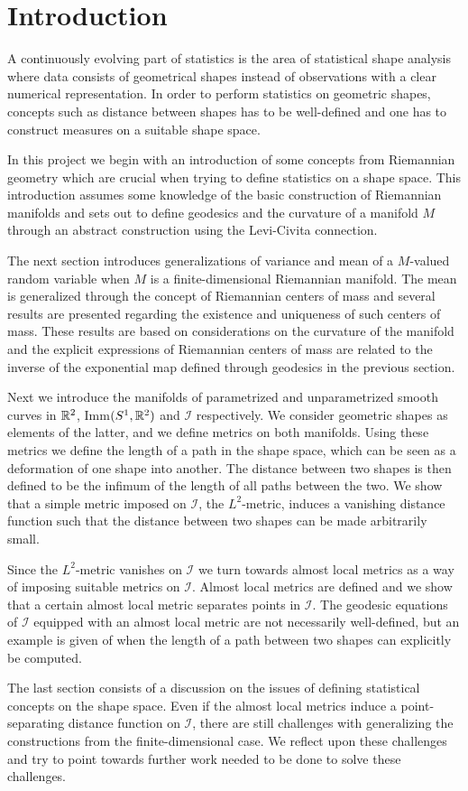 \section*{Introduction}
\label{sec:introduction}

A continuously evolving part of statistics is the area of statistical shape analysis where data consists of geometrical shapes instead of observations with a clear numerical representation. In order to perform statistics on geometric shapes, concepts such as distance between shapes has to be well-defined and one has to construct measures on a suitable shape space.

In this project we begin with an introduction of some concepts from Riemannian geometry which are crucial when trying to define statistics on a shape space. This introduction assumes some knowledge of the basic construction of Riemannian manifolds and sets out to define geodesics and the curvature of a manifold $M$ through an abstract construction using the Levi-Civita connection.

The next section introduces generalizations of variance and mean of a $M$-valued random variable when $M$ is a finite-dimensional Riemannian manifold. The mean is generalized through the concept of Riemannian centers of mass and several results are presented regarding the existence and uniqueness of such centers of mass. These results are based on considerations on the curvature of the manifold and the explicit expressions of Riemannian centers of mass are related to the inverse of the exponential map defined through geodesics in the previous section.

Next we introduce the manifolds of parametrized and unparametrized smooth curves in $\mathbb{R}^2$, Imm$(S^1, \mathbb{R}^2)$ and $\mathcal{I}$ respectively. We consider geometric shapes as elements of the latter, and we define metrics on both manifolds. Using these metrics we define the length of a path in the shape space, which can be seen as a deformation of one shape into another. The distance between two shapes is then defined to be the infimum of the length of all paths between the two. We show that a simple metric imposed on $\mathcal{I}$, the $L^2$-metric, induces a vanishing distance function such that the distance between two shapes can be made arbitrarily small.

Since the $L^2$-metric vanishes on $\mathcal{I}$ we turn towards almost local metrics as a way of imposing suitable metrics on $\mathcal{I}$. Almost local metrics are defined and we show that a certain almost local metric separates points in $\mathcal{I}$. The geodesic equations of $\mathcal{I}$ equipped with an almost local metric are not necessarily well-defined, but an example is given of when the length of a path between two shapes can explicitly be computed.

The last section consists of a discussion on the issues of defining statistical concepts on the shape space. Even if the almost local metrics induce a point-separating distance function on $\mathcal{I}$, there are still challenges with generalizing the constructions from the finite-dimensional case. We reflect upon these challenges and try to point towards further work needed to be done to solve these challenges.
